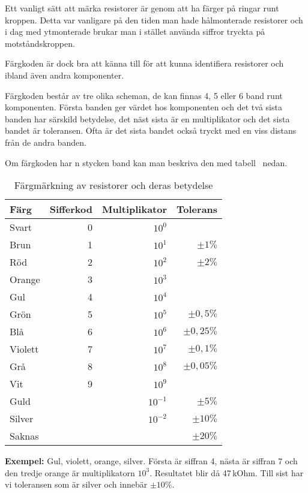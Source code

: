 Ett vanligt sätt att märka resistorer är genom att ha färger på ringar
runt kroppen. Detta var vanligare på den tiden man hade hålmonterade
resistorer och i dag med ytmonterade brukar man i stället använda
siffror tryckta på motståndskroppen.

Färgkoden är dock bra att känna till för att kunna identifiera resistorer
och ibland även andra komponenter.

Färgkoden består av tre olika scheman, de kan finnas 4, 5 eller 6 band runt
komponenten.
Första banden ger värdet hos komponenten och det två sista banden har särskild
betydelse, det näst sista är en multiplikator och det sista bandet är
toleransen.
Ofta är det sista bandet också tryckt med en viss distans från de andra banden.

Om färgkoden har n stycken band kan man beskriva den med tabell~ nedan.

\begin{table}[H]
\begin{tabular}{lrrr}
	\textbf{Färg}    & \textbf{Sifferkod} &     \textbf{Multiplikator} 
	&     \textbf{Tolerans} \\ \hline \hline
	Svart   &         0 &    $10^0$ &              \\ \hline
	Brun    &         1 &    $10^1$ &    $\pm 1\%$ \\ \hline
	Röd     &         2 &    $10^2$ &    $\pm 2\%$ \\ \hline
	Orange  &         3 &    $10^3$ &              \\ \hline
	Gul     &         4 &    $10^4$ &              \\ \hline
	Grön    &         5 &    $10^5$ &  $\pm 0,5\%$ \\ \hline
	Blå     &         6 &    $10^6$ & $\pm 0,25\%$ \\ \hline
	Violett &         7 &    $10^7$ &  $\pm 0,1\%$ \\ \hline
	Grå     &         8 &    $10^8$ & $\pm 0,05\%$ \\ \hline
	Vit     &         9 &    $10^9$ &              \\ \hline
	Guld    &           & $10^{-1}$ &    $\pm 5\%$ \\ \hline
	Silver  &           & $10^{-2}$ &   $\pm 10\%$ \\ \hline
	Saknas  &           &           &   $\pm 20\%$ \\ \hline
\end{tabular}
\caption{Färgmärkning av resistorer och deras betydelse}
\label{tab:rcolors}
\end{table}

\textbf{Exempel:} Gul, violett, orange, silver.
Första är siffran 4, nästa är siffran 7 och den tredje orange är
multiplikatorn $10^3$.
Resultatet blir då 47\,kOhm.
Till sist har vi toleransen som är silver och innebär $\pm 10\%$.
